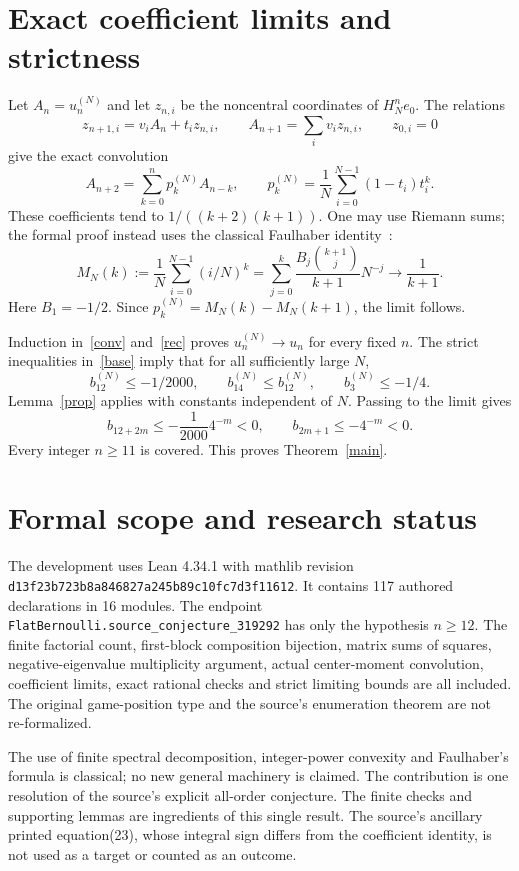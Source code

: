 \documentclass[11pt]{article}
\begin{document}
\section{Exact coefficient limits and strictness}
Let $A_n=u_n^{(N)}$ and let $z_{n,i}$ be the noncentral coordinates of
$H_N^ne_0$. The relations
\[
 z_{n+1,i}=v_iA_n+t_iz_{n,i},\qquad
 A_{n+1}=\sum_i v_iz_{n,i},\qquad z_{0,i}=0
\]
give the exact convolution
\begin{equation}\label{conv}
 A_{n+2}=\sum_{k=0}^np_k^{(N)}A_{n-k},\qquad
 p_k^{(N)}=\frac1N\sum_{i=0}^{N-1}(1-t_i)t_i^k.
\end{equation}
These coefficients tend to $1/((k+2)(k+1))$. One may use Riemann sums;
the formal proof instead uses the classical Faulhaber identity~\cite{M}:
\[
 M_N(k):=\frac1N\sum_{i=0}^{N-1}(i/N)^k
 =\sum_{j=0}^k\frac{B_j\binom{k+1}{j}}{k+1}N^{-j}
 \longrightarrow\frac1{k+1}.
\]
Here $B_1=-1/2$. Since $p_k^{(N)}=M_N(k)-M_N(k+1)$, the limit follows.

\newpage
Induction in~\eqref{conv} and~\eqref{rec} proves
$u_n^{(N)}\to u_n$ for every fixed $n$. The strict inequalities
in~\eqref{base} imply that for all sufficiently large $N$,
\[
 b_{12}^{(N)}\le-1/2000,\qquad b_{14}^{(N)}\le b_{12}^{(N)},\qquad
 b_3^{(N)}\le-1/4.
\]
Lemma~\ref{prop} applies with constants independent of $N$.
Passing to the limit gives
\[
 b_{12+2m}\le-\frac1{2000}4^{-m}<0,\qquad b_{2m+1}\le-4^{-m}<0.
\]
Every integer $n\ge11$ is covered. This proves Theorem~\ref{main}.

\section{Formal scope and research status}
The development uses Lean 4.34.1 with mathlib revision
\texttt{d13f23b723b8a846827a245b89c10fc7d3f11612}.
It contains 117 authored declarations in 16 modules. The endpoint
\texttt{FlatBernoulli.source\_conjecture\_319292} has only the hypothesis
$n\ge12$. The finite factorial count, first-block composition bijection,
matrix sums of squares, negative-eigenvalue multiplicity argument, actual
center-moment convolution, coefficient limits, exact rational checks and
strict limiting bounds are all included. The original game-position type
and the source's enumeration theorem are not re-formalized.

The use of finite spectral decomposition, integer-power convexity and
Faulhaber's formula is classical; no new general machinery is claimed.
The contribution is one resolution of the source's explicit all-order conjecture.
The finite checks and supporting lemmas are ingredients of this single result.
The source's ancillary printed equation(23), whose integral sign differs
from the coefficient identity, is not used as a target or counted as an outcome.
\end{document}
